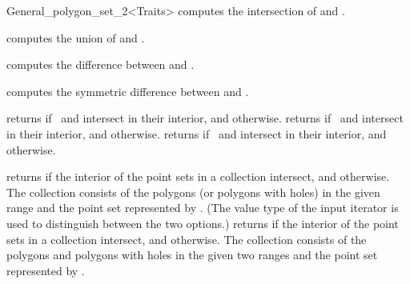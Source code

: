 \begin{ccRefClass}{General_polygon_set_2<Traits>}
  {computes the intersection of  and .}

  {computes the union of  and .}

  {computes the difference between  and .}

  {computes the symmetric difference between  and .}
  
\ccQueryFunctions

\ccThreeToTwo

  {returns  if \ccVar\ and  intersect in their
  interior, and  otherwise.}
\ccGlue
{}
  {returns  if \ccVar\ and  intersect in their
  interior, and  otherwise.}
\ccGlue
{}
  {returns  if \ccVar\ and  intersect in their
  interior, and  otherwise.}
  
  {returns  if the interior of the point sets in a collection 
   intersect, and  otherwise. The collection consists of the 
   polygons (or polygons with holes) in the given range and the point set 
   represented by \ccVar. (The value type of the input iterator is used to 
   distinguish between the two options.)}
\ccGlue
{}
  {returns  if the interior of the point sets in a collection 
   intersect, and  otherwise. The collection consists of the 
   polygons and polygons with holes in the given two ranges and the point 
   set represented by \ccVar.}


\end{ccRefClass}
